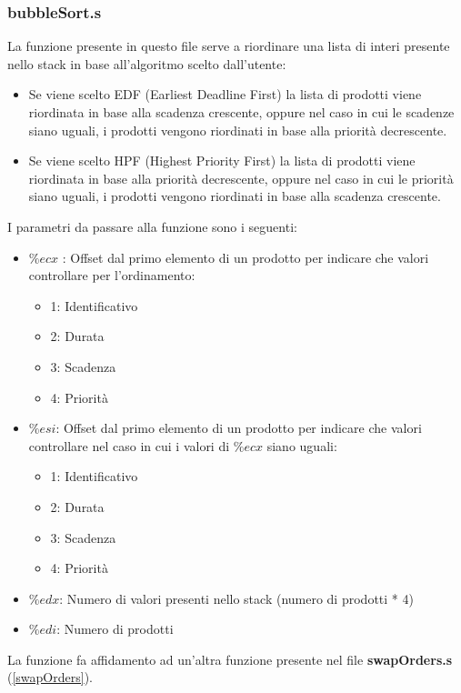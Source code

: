 \documentclass[a4paper]{article}
\begin{document}
\subsubsection{bubbleSort.s}
\label{bubbleSort}
La funzione presente in questo file serve a riordinare una lista di interi presente nello
stack in base all'algoritmo scelto dall'utente:
\begin{itemize}
	\item Se viene scelto EDF (Earliest Deadline First) la lista di prodotti viene riordinata
	      in base alla scadenza crescente, oppure nel caso in cui le scadenze siano uguali, i
	      prodotti vengono riordinati in base alla priorità decrescente.

	\item Se viene scelto HPF (Highest Priority First) la lista di prodotti viene riordinata
	      in base alla priorità decrescente, oppure nel caso in cui le priorità siano uguali, i
	      prodotti vengono riordinati in base alla scadenza crescente.
\end{itemize}
I parametri da passare alla funzione sono i seguenti:
\begin{itemize}
	\item \( \%ecx \) : Offset dal primo elemento di un prodotto per indicare che valori
	      controllare per l'ordinamento:
	      \begin{itemize}
		      \item 1: Identificativo
		      \item 2: Durata
		      \item 3: Scadenza
		      \item 4: Priorità
	      \end{itemize}
	\item \( \%esi \): Offset dal primo elemento di un prodotto per indicare che valori
	      controllare nel caso in cui i valori di \( \%ecx \) siano uguali:
	      \begin{itemize}
		      \item 1: Identificativo
		      \item 2: Durata
		      \item 3: Scadenza
		      \item 4: Priorità
	      \end{itemize}
	\item \( \%edx \): Numero di valori presenti nello stack (numero di prodotti * 4)
	\item \( \%edi \): Numero di prodotti
\end{itemize}
La funzione fa affidamento ad un'altra funzione presente nel file \textbf{swapOrders.s} (\ref{swapOrders}).
\end{document}
